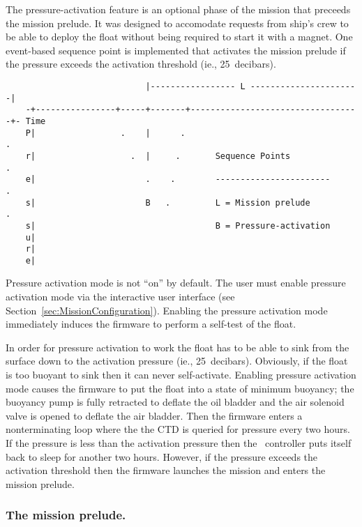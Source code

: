 The pressure-activation feature is an optional phase of the mission that
preceeds the mission prelude.  It was designed to accomodate requests from
ship's crew to be able to deploy the float without being required to start
it with a magnet.  One event-based sequence point is implemented that
activates the mission prelude if the pressure exceeds the activation
threshold (ie., 25~decibars).

\begin{minipage}{6in}
   \begin{verbatim}
                            |----------------- L ----------------------|
    -+----------------+-----+-------+----------------------------------+- Time
    P|                 .    |      .                                    .    
    r|                   .  |     .       Sequence Points                 .   
    e|                      .    .        -----------------------           .  
    s|                      B   .         L = Mission prelude                  .
    s|                                    B = Pressure-activation
    u|
    r|
    e|
  \end{verbatim}
\end{minipage}

Pressure activation mode is not ``on'' by default.  The user must enable
pressure activation mode via the interactive user interface (see
Section~\ref{sec:MissionConfiguration}).  Enabling the pressure activation
mode immediately induces the firmware to perform a self-test of the float.
 
In order for pressure activation to work the float has to be able to sink
from the surface down to the activation pressure (ie., 25~decibars).
Obviously, if the float is too buoyant to sink then it can never
self-activate.  Enabling pressure activation mode causes the firmware to put
the float into a state of minimum buoyancy; the buoyancy pump is fully
retracted to deflate the oil bladder and the air solenoid valve is opened to
deflate the air bladder.  Then the firmware enters a nonterminating loop
where the the CTD is queried for pressure every two hours.  If the pressure is
less than the activation pressure then the \apf\ controller puts itself back
to sleep for another two hours.  However, if the pressure exceeds the
activation threshold then the firmware launches the mission and enters the
mission prelude.

\subsubsection{The mission prelude.}

